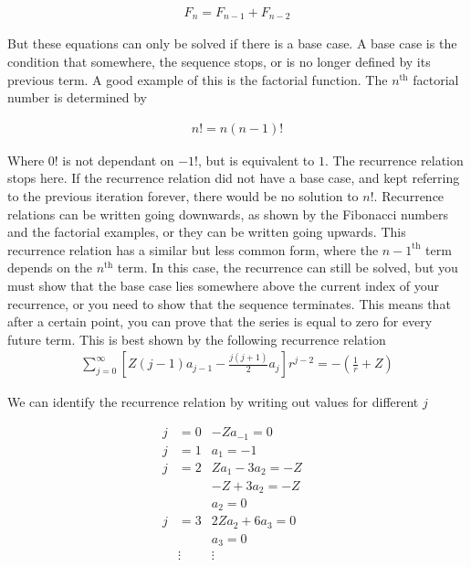         \begin{align}
            F_n = F_{n - 1} + F_{n - 2}
        \end{align}

        But these equations can only be solved if there is a base case. A base case is the condition that somewhere, the sequence stops, or is no longer defined by its previous term. A good example of this is the factorial function. The $n^{\text{th}}$ factorial number is determined by 

        \begin{align}
            n! = n(n-1)!
        \end{align}

        Where $0!$ is not dependant on $-1!$, but is equivalent to $1$. The recurrence relation stops here. If the recurrence relation did not have a base case, and kept referring to the previous iteration forever, there would be no solution to $n!$. Recurrence relations can be written going downwards, as shown by the Fibonacci numbers and the factorial examples, or they can be written going upwards. This recurrence relation has a similar but less common form, where the $n-1^{\text{th}}$ term depends on the $n^{\text{th}}$ term. In this case, the recurrence can still be solved, but you must show that the base case lies somewhere above the current index of your recurrence, or you need to show that the sequence terminates. This means that after a certain point, you can prove that the series is equal to zero for every future term. This is best shown by the following recurrence relation 
        \begin{align}
            \sum_{j = 0}^\infty \left[ Z(j - 1) a_{j - 1} - \frac{j(j+1)}{2} a_j \right] r^{j - 2} = -\left(\frac{1}{r} + Z\right)
        \end{align}

        We can identify the recurrence relation by writing out values for different $j$ 

        \begin{align}
            j &= 0 & -Za_{-1} = 0&\\ \nonumber
            j &= 1 & a_1 = -1&\\ \nonumber
            j &= 2 & Za_1 - 3a_2 = -Z&\\ \nonumber
            & & -Z + 3a_2 = -Z&\\ \nonumber
            & & a_2 = 0&\\ \nonumber
            j &= 3 & 2Za_2 + 6a_3 = 0&\\ \nonumber
            & & a_3 = 0&\\ \nonumber
            & \vdots & \vdots & \\
        \end{align}

